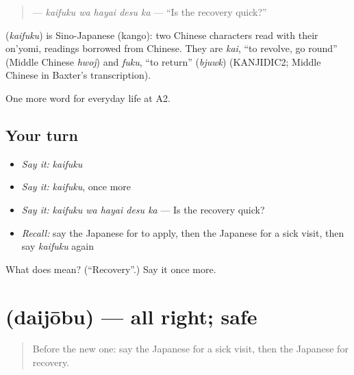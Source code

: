 \begin{quote}
\textbf{ } — \emph{kaifuku wa hayai desu ka} — \textquotedblleft{}Is the recovery quick?\textquotedblright{}
\end{quote}

\begin{cousinweb}
\textbf{} (\emph{kaifuku}) is Sino-Japanese (kango): two Chinese characters read with their on'yomi, readings borrowed from Chinese. They are \emph{kai}, \textquotedblleft{}to revolve, go round\textquotedblright{} (Middle Chinese \emph{hwoj}) and \emph{fuku}, \textquotedblleft{}to return\textquotedblright{} (\emph{bjuwk}) (KANJIDIC2; Middle Chinese in Baxter's transcription).
\end{cousinweb}

\begin{grammarlens}[title={What you've built}]
One more word for everyday life at A2.
\end{grammarlens}

\subsection*{Your turn}
\begin{itemize}
\raggedright
  \item \emph{Say it:} \emph{kaifuku}
  \item \emph{Say it:} \emph{kaifuku}, once more
  \item \emph{Say it:} \emph{kaifuku wa hayai desu ka} — Is the recovery quick?
  \item \emph{Recall:} say the Japanese for to apply, then the Japanese for a sick visit, then say \emph{kaifuku} again
\end{itemize}

\begin{tcolorbox}[breakable,colback=teal!4,colframe=teal!35!black,title={Before you move on}]
What does  mean? (\textquotedblleft{}Recovery\textquotedblright{}.) Say it once more.
\end{tcolorbox}
\section[\texorpdfstring{\ja{だいじょうぶ} (daijōbu)}{だいじょうぶ (daijōbu)}]{ (daijōbu) — all right; safe}

\label{lesson:JA-C222-daijoubu}



\begin{quote}
Before the new one: say the Japanese for a sick visit, then the Japanese for recovery.
\end{quote}

